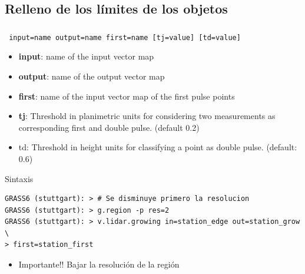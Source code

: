 \subsection{Relleno de los límites de los objetos}
\begin{frame}[fragile,shrink=10]
  \frametitle{}
  \begin{beamerboxesrounded}[shadow=true]{\textbf{}
    \texttt{ input=name output=name first=name [tj=value] [td=value]}}
    \begin{itemize}
     \item \textbf{input}: name of the input vector map
     \item \textbf{output}: name of the output vector map
     \item \textbf{first}: name of the input vector map of the first pulse points
     \item \textbf{tj}: Threshold in planimetric units for considering two 
         measurements as corresponding first and double pulse. (default 0.2)
     \item td: Threshold in height units for classifying a point as double pulse. 
         (default: 0.6)
    \end{itemize}
  \end{beamerboxesrounded}
  \pause
  \begin{beamerboxesrounded}[shadow=true]{Sintaxis}
\scriptsize
\begin{verbatim}
GRASS6 (stuttgart): > # Se disminuye primero la resolucion
GRASS6 (stuttgart): > g.region -p res=2
GRASS6 (stuttgart): > v.lidar.growing in=station_edge out=station_grow \
> first=station_first
\end{verbatim}
\end{beamerboxesrounded}
\begin{itemize}
 \item \alert{Importante!!} Bajar la resolución de la región
\end{itemize}
\end{frame}
\pgfdeclareimage[width=0.65\textwidth]{grow}{images/grow}
